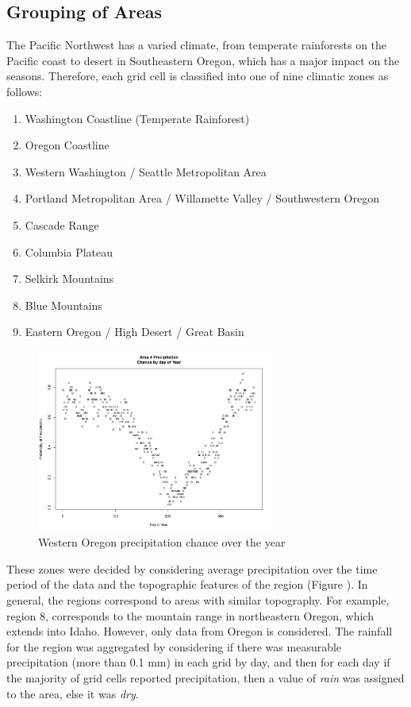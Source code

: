 \documentclass{article}
\begin{document}
\subsection{Grouping of Areas} \label{GroupArea}
The Pacific Northwest has a varied climate, from temperate rainforests on the Pacific coast to desert in Southeastern Oregon, which has a major impact on the seasons. Therefore, each grid cell is classified into one of nine climatic zones as follows:
\begin{enumerate}
\item Washington Coastline (Temperate Rainforest)
\item Oregon Coastline
\item Western Washington / Seattle Metropolitan Area
\item Portland Metropolitan Area / Willamette Valley / Southwestern Oregon
\item Cascade Range
\item Columbia Plateau
\item Selkirk Mountains
\item Blue Mountains
\item Eastern Oregon / High Desert / Great Basin
\end{enumerate}
\begin{figure}[h!]
\centering
\includegraphics[width = .4\textwidth, height = 6cm]{Area4PrecipByDay}
\caption{Western Oregon precipitation chance over the year}
\label{fig:area4}
\end{figure}
These zones were decided by considering average precipitation over the time period of the data and the topographic features of the region (Figure \label{fig:topo}). In general, the regions correspond to areas with similar topography. For example, region 8, corresponds to the mountain range in northeastern Oregon, which extends into Idaho. However, only data from Oregon is considered. The rainfall for the region was aggregated by considering if there was measurable precipitation (more than 0.1 mm) in each grid by day, and then for each day if the majority of grid cells reported precipitation, then a value of \textit{rain} was assigned to the area, else it was \textit{dry}.
\end{document}
